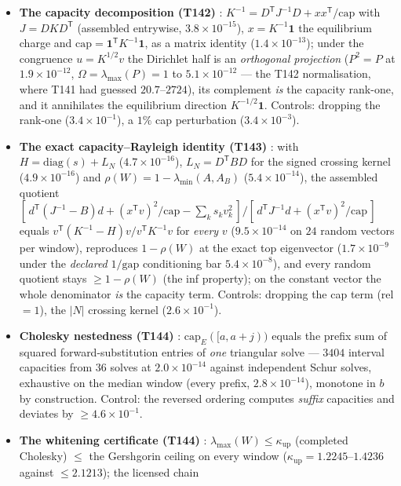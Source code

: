 \documentclass[11pt,a4paper]{article}
\begin{document}
\begin{itemize}[leftmargin=1.5em]
\item \textbf{The capacity decomposition (T142)} \mE:
$K^{-1}=D^{\mathsf T}J^{-1}D+xx^{\mathsf T}/\mathrm{cap}$ with $J=DKD^{\mathsf T}$ (assembled
entrywise, $3.8\times10^{-15}$), $x=K^{-1}\mathbf 1$ the equilibrium charge and
$\mathrm{cap}=\mathbf 1^{\mathsf T}K^{-1}\mathbf 1$, as a matrix identity ($1.4\times10^{-13}$);
under the congruence $u=K^{1/2}v$ the Dirichlet half is an \emph{orthogonal projection} ($P^2=P$
at $1.9\times10^{-12}$, $\Omega=\lambda_{\max}(P)=1$ to $5.1\times10^{-12}$ --- the T142
normalisation, where T141 had guessed $20.7$--$2724$), its complement \emph{is} the capacity
rank-one, and it annihilates the equilibrium direction $K^{-1/2}\mathbf 1$. Controls: dropping
the rank-one ($3.4\times10^{-1}$), a $1\%$ cap perturbation ($3.4\times10^{-3}$).
\item \textbf{The exact capacity--Rayleigh identity (T143)} \mE: with $H=\mathrm{diag}(s)+L_N$
($4.7\times10^{-16}$), $L_N=D^{\mathsf T}BD$ for the signed crossing kernel
($4.9\times10^{-16}$) and $\rho(W)=1-\lambda_{\min}(A,A_B)$ ($5.4\times10^{-14}$), the assembled
quotient
$[\,d^{\mathsf T}(J^{-1}-B)d+(x^{\mathsf T}v)^2/\mathrm{cap}-\sum_ks_kv_k^2\,]/[\,d^{\mathsf T}J^{-1}d+(x^{\mathsf T}v)^2/\mathrm{cap}\,]$
equals $v^{\mathsf T}(K^{-1}-H)v/v^{\mathsf T}K^{-1}v$ for \emph{every} $v$
($9.5\times10^{-14}$ on $24$ random vectors per window), reproduces $1-\rho(W)$ at the exact top
eigenvector ($1.7\times10^{-9}$ under the \emph{declared} $1/\mathrm{gap}$ conditioning bar
$5.4\times10^{-8}$), and every random quotient stays $\ge1-\rho(W)$ (the inf property); on the
constant vector the whole denominator \emph{is} the capacity term. Controls: dropping the cap
term (rel $=1$), the $|N|$ crossing kernel ($2.6\times10^{-1}$).
\item \textbf{Cholesky nestedness (T144)} \mE: $\mathrm{cap}_E([a,a{+}j))$ equals the prefix sum
of squared forward-substitution entries of \emph{one} triangular solve --- $3404$ interval
capacities from $36$ solves at $2.0\times10^{-14}$ against independent Schur solves, exhaustive
on the median window (every prefix, $2.8\times10^{-14}$), monotone in $b$ by construction.
Control: the reversed ordering computes \emph{suffix} capacities and deviates by
$\ge4.6\times10^{-1}$.
\item \textbf{The whitening certificate (T144)} \mE:
$\lambda_{\max}(W)\le\kappa_{\mathrm{up}}$ (completed Cholesky) $\le$ the Gershgorin ceiling on
every window ($\kappa_{\mathrm{up}}=1.2245$--$1.4236$ against $\le2.1213$); the licensed chain

\end{itemize}
\end{document}
